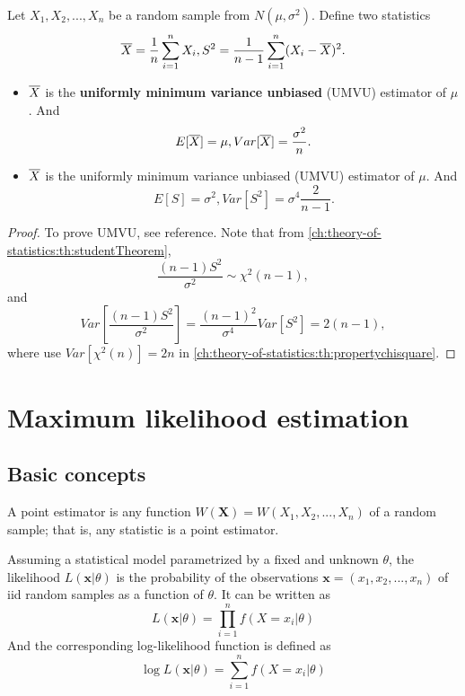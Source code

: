 \begin{refsection}
\begin{lemma}\cite{sciacchitano2015collaborative}
Let $X_1,X_2,...,X_n$ be a random sample from $N(\mu, \sigma^2)$. Define two statistics
$$\overline{X} = \frac{1}{n}\sum_{i=1}^n X_i, S^2 = \frac{1}{n-1}\sum_{i=1}^n (X_i - \overline{X})^2.$$
\begin{itemize}
	\item $\overline{X}$ is the \textbf{uniformly minimum variance unbiased }(UMVU) estimator of $\mu$. And
	$$E[\overline{X}] = \mu, Var[\overline{X}] = \frac{\sigma^2}{n}.$$
	\item $\overline{X}$ is the uniformly minimum variance unbiased (UMVU) estimator of $\mu$. And
	$$E[S] = \sigma^2, Var[S^2] = \sigma^4\frac{2}{n-1}.$$
\end{itemize}	
\end{lemma}
\begin{proof}
To prove UMVU, see reference. Note that from \autoref{ch:theory-of-statistics:th:studentTheorem},
$$\frac{(n-1)S^2}{\sigma^2}\sim \chi^2({n-1}),$$
and
$$Var[\frac{(n-1)S^2}{\sigma^2}] = \frac{(n-1)^2}{\sigma^4}Var[S^2] = 2(n-1),$$
where use $Var[\chi^2(n)] = 2n$ in \autoref{ch:theory-of-statistics:th:propertychisquare}.
\end{proof}

\section{Maximum likelihood estimation}
\subsection{Basic concepts}
\begin{definition}[estimator]\cite[315]{casella2002statistical}
	A point estimator is any function $W(\bm{X})=W(X_1,X_2,...,X_n)$ of a random sample; that is, any statistic is a point estimator.
\end{definition}

\begin{definition}
	\cite[22]{pawitan2001all}
	Assuming a statistical model parametrized by a fixed and unknown $\theta$, the likelihood $L(\bm{x}|\theta)$ is the probability of the observations $\bm{x}=(x_1,x_2,...,x_n)$ of iid random samples as a function of $\theta$. It can be written as
	$$L(\bm{x}|\theta) = \prod_{i=1}^n f(X=x_i|\theta)$$
	And the corresponding log-likelihood function is defined as
	$$\log L(\bm{x}|\theta) = \sum_{i=1}^n f(X=x_i|\theta)$$
	

\end{definition}
\end{refsection}
